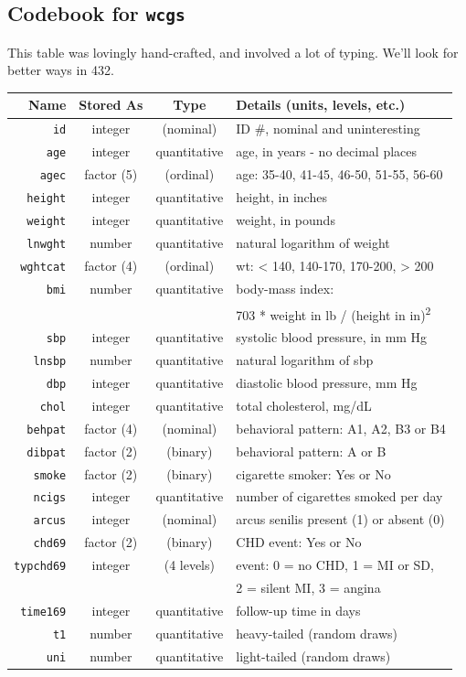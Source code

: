\documentclass[
]{book}
\begin{document}
\hypertarget{codebook-for-wcgs}{%
\subsection{\texorpdfstring{Codebook for \texttt{wcgs}}{Codebook for wcgs}}\label{codebook-for-wcgs}}

This table was lovingly hand-crafted, and involved a lot of typing. We'll look for better ways in 432.

\begin{longtable}[]{@{}rccl@{}}
\toprule
Name & Stored As & Type & Details (units, levels, etc.)\tabularnewline
\midrule
\endhead
\texttt{id} & integer & (nominal) & ID \#, nominal and uninteresting\tabularnewline
\texttt{age} & integer & quantitative & age, in years - no decimal places\tabularnewline
\texttt{agec} & factor (5) & (ordinal) & age: 35-40, 41-45, 46-50, 51-55, 56-60\tabularnewline
\texttt{height} & integer & quantitative & height, in inches\tabularnewline
\texttt{weight} & integer & quantitative & weight, in pounds\tabularnewline
\texttt{lnwght} & number & quantitative & natural logarithm of weight\tabularnewline
\texttt{wghtcat} & factor (4) & (ordinal) & wt: \textless{} 140, 140-170, 170-200, \textgreater{} 200\tabularnewline
\texttt{bmi} & number & quantitative & body-mass index:\tabularnewline
& & & 703 * weight in lb / (height in in)\textsuperscript{2}\tabularnewline
\texttt{sbp} & integer & quantitative & systolic blood pressure, in mm Hg\tabularnewline
\texttt{lnsbp} & number & quantitative & natural logarithm of sbp\tabularnewline
\texttt{dbp} & integer & quantitative & diastolic blood pressure, mm Hg\tabularnewline
\texttt{chol} & integer & quantitative & total cholesterol, mg/dL\tabularnewline
\texttt{behpat} & factor (4) & (nominal) & behavioral pattern: A1, A2, B3 or B4\tabularnewline
\texttt{dibpat} & factor (2) & (binary) & behavioral pattern: A or B\tabularnewline
\texttt{smoke} & factor (2) & (binary) & cigarette smoker: Yes or No\tabularnewline
\texttt{ncigs} & integer & quantitative & number of cigarettes smoked per day\tabularnewline
\texttt{arcus} & integer & (nominal) & arcus senilis present (1) or absent (0)\tabularnewline
\texttt{chd69} & factor (2) & (binary) & CHD event: Yes or No\tabularnewline
\texttt{typchd69} & integer & (4 levels) & event: 0 = no CHD, 1 = MI or SD,\tabularnewline
& & & 2 = silent MI, 3 = angina\tabularnewline
\texttt{time169} & integer & quantitative & follow-up time in days\tabularnewline
\texttt{t1} & number & quantitative & heavy-tailed (random draws)\tabularnewline
\texttt{uni} & number & quantitative & light-tailed (random draws)\tabularnewline
\bottomrule
\end{longtable}
\end{document}

